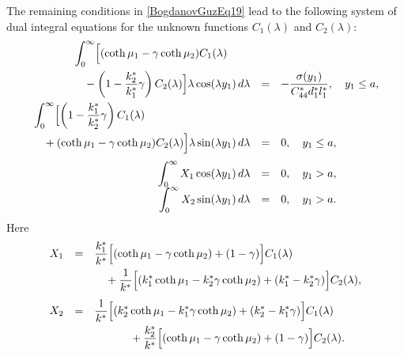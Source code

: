 The remaining conditions in \eqref{BogdanovGuzEq19} lead to the following system of dual integral equations for the unknown functions $C_{1}(\lambda)$ and $C_{2}(\lambda)$:
\begin{equation}
	\label{BogdanovGuzEq30}
	\begin{array}{rcl}
			\begin{multlined}[b]
				\displaystyle
				\int_{0}^{\infty}
				\Bigl[
				(\coth\mu_{1}-\gamma\coth\mu_{2})C_{1}(\lambda)
				\\[-1em]
				-
				\left(1-\frac{k_{2}^{*}}{k_{1}^{*}}\gamma\right)C_{2}(\lambda)
				\Bigr]
				\lambda\cos(\lambda y_{1})\,d\lambda
				\end{multlined}
				&=&-\dfrac{\sigma(y_{1})}{C_{44}^{*}d_{1}^{*}l_{1}^{*}},
				\quad y_{1}\le a,
		\\[1em]
			\begin{multlined}[b]
				\displaystyle
				\int_{0}^{\infty}
				\Bigl[
				\left(1-\frac{k_{1}^{*}}{k_{2}^{*}}\gamma\right)C_{1}(\lambda)
				\\[-1em]
				+
				(\coth\mu_{1}-\gamma\coth\mu_{2})C_{2}(\lambda)
				\Bigr]
				\lambda\sin(\lambda y_{1})\,d\lambda
			\end{multlined}
				&=&0,
				\quad y_{1}\le a,
		\\[1em]
		\displaystyle
		\int_{0}^{\infty} X_{1}\cos(\lambda y_{1})\,d\lambda
		&=&0,
		\quad y_{1}>a,
		\\
		\displaystyle
		\int_{0}^{\infty} X_{2}\sin(\lambda y_{1})\,d\lambda
		&=&0,
		\quad y_{1}>a.
	\end{array}
\end{equation}
%
Here
\[
\begin{array}{rcl}
	X_{1}
	&=&
	\begin{multlined}[t]
		\displaystyle
		\frac{k_{1}^{*}}{k^{*}}
		\Bigl[
		(\coth\mu_{1}-\gamma\coth\mu_{2})
		+(1-\gamma)
		\Bigr]C_{1}(\lambda)
		\\[-1em]
		+
		\frac{1}{k^{*}}
		\Bigl[
		(k_{1}^{*}\coth\mu_{1}-k_{2}^{*}\gamma\coth\mu_{2})
		+
		(k_{1}^{*}-k_{2}^{*}\gamma)
		\Bigr]C_{2}(\lambda),
	\end{multlined}
	\\[3.5em]
	X_{2}
	&=&
	\begin{multlined}[t]
		\displaystyle
		\frac{1}{k^{*}}
		\Bigl[
		(k_{2}^{*}\coth\mu_{1}-k_{1}^{*}\gamma\coth\mu_{2})
		+
		(k_{2}^{*}-k_{1}^{*}\gamma)
		\Bigr]C_{1}(\lambda)
		\\[-1em]
		+
		\frac{k_{2}^{*}}{k^{*}}
		\Bigl[
		(\coth\mu_{1}-\gamma\coth\mu_{2})
		+(1-\gamma)
		\Bigr]C_{2}(\lambda).
	\end{multlined}
\end{array}
\]


